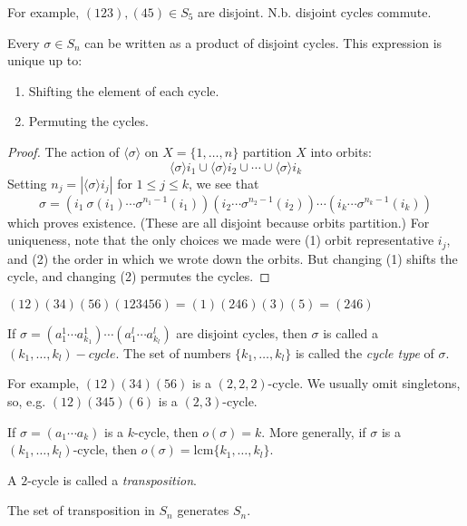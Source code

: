 \documentclass[10pt, a4paper, twoside]{report}
\begin{document}
For example, \((123),(45)\in S_5\) are disjoint. N.b. disjoint cycles commute.
\begin{theorem}
    Every \(\sigma\in S_n\) can be written as a product of disjoint cycles. This expression is unique up to:
    \begin{enumerate}
        \item Shifting the element of each cycle.
        \item Permuting the cycles.
    \end{enumerate}
\end{theorem}
\begin{proof}
    The action of \(\langle\sigma\rangle\) on \(X=\{1,\ldots,n\}\) partition \(X\) into orbits:
    \[\langle\sigma\rangle i_1\cup\langle\sigma\rangle i_2\cup\cdots\cup\langle\sigma\rangle i_k\]
    Setting \(n_j=|\langle\sigma\rangle i_j|\) for \(1\leq j\leq k\), we see that 
    \[\sigma=(i_1\:\sigma(i_1)\cdots\sigma^{n_1-1}(i_1))(i_2\cdots\sigma^{n_2-1}(i_2))\cdots(i_k\cdots\sigma^{n_k-1}(i_k))\]
    which proves existence. (These are all disjoint because orbits partition.) For uniqueness, note that the only choices we made were (1) orbit representative \(i_j\), and (2) the order in which we wrote down the orbits. But changing (1) shifts the cycle, and changing (2) permutes the cycles.
\end{proof}
\begin{example}
    \((12)(34)(56)(123456)=(1)(246)(3)(5)=(246)\)
\end{example}
\begin{definition}
    If \(\sigma=(a_1^1\cdots a_{k_1}^1)\cdots(a_1^l\cdots a_{k_l}^l)\) are disjoint cycles, then \(\sigma\) is called a \emph{\((k_1,\ldots,k_l)-cycle\)}. The set of numbers \(\{k_1,\ldots,k_l\}\) is called the \emph{cycle type} of \(\sigma\).
\end{definition}
For example, \((12)(34)(56)\) is a \((2,2,2)\)-cycle. We usually omit singletons, so, e.g. \((12)(345)(6)\) is a \((2,3)\)-cycle.
\begin{remark}
    If \(\sigma=(a_1\cdots a_k)\) is a \(k\)-cycle, then \(o(\sigma)=k\). More generally, if \(\sigma\) is a \((k_1,\ldots,k_l)\)-cycle, then \(o(\sigma)=\text{lcm}\{k_1,\ldots,k_l\}\).
\end{remark}
\begin{definition}
    A \(2\)-cycle is called a \emph{transposition}.
\end{definition}
\begin{theorem}
    The set of transposition in \(S_n\) generates \(S_n\).
\end{theorem}
\end{document}

